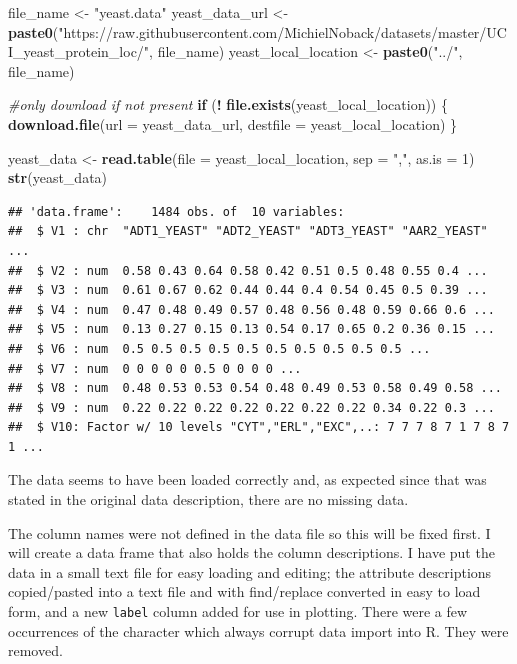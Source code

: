 \documentclass[]{book}
\newenvironment{Shaded}{\begin{snugshade}}{\end{snugshade}}
\newcommand{\CommentTok}[1]{\textcolor[rgb]{0.56,0.35,0.01}{\textit{#1}}}
\newcommand{\ControlFlowTok}[1]{\textcolor[rgb]{0.13,0.29,0.53}{\textbf{#1}}}
\newcommand{\DataTypeTok}[1]{\textcolor[rgb]{0.13,0.29,0.53}{#1}}
\newcommand{\DecValTok}[1]{\textcolor[rgb]{0.00,0.00,0.81}{#1}}
\newcommand{\KeywordTok}[1]{\textcolor[rgb]{0.13,0.29,0.53}{\textbf{#1}}}
\newcommand{\NormalTok}[1]{#1}
\newcommand{\OperatorTok}[1]{\textcolor[rgb]{0.81,0.36,0.00}{\textbf{#1}}}
\newcommand{\StringTok}[1]{\textcolor[rgb]{0.31,0.60,0.02}{#1}}
\begin{document}
\begin{Shaded}
\begin{Highlighting}[]
\NormalTok{file_name <-}\StringTok{ "yeast.data"}
\NormalTok{yeast_data_url <-}\StringTok{ }\KeywordTok{paste0}\NormalTok{(}\StringTok{"https://raw.githubusercontent.com/MichielNoback/datasets/master/UCI_yeast_protein_loc/"}\NormalTok{, file_name)}
\NormalTok{yeast_local_location <-}\StringTok{ }\KeywordTok{paste0}\NormalTok{(}\StringTok{"../"}\NormalTok{, file_name)}

\CommentTok{#only download if not present}
\ControlFlowTok{if}\NormalTok{ (}\OperatorTok{!}\StringTok{ }\KeywordTok{file.exists}\NormalTok{(yeast_local_location)) \{}
    \KeywordTok{download.file}\NormalTok{(}\DataTypeTok{url =}\NormalTok{ yeast_data_url, }
                  \DataTypeTok{destfile =}\NormalTok{ yeast_local_location)}
\NormalTok{\}}

\NormalTok{yeast_data <-}\StringTok{ }\KeywordTok{read.table}\NormalTok{(}\DataTypeTok{file =}\NormalTok{ yeast_local_location,}
                         \DataTypeTok{sep =} \StringTok{","}\NormalTok{,}
                         \DataTypeTok{as.is =} \DecValTok{1}\NormalTok{)}
\KeywordTok{str}\NormalTok{(yeast_data)}
\end{Highlighting}
\end{Shaded}

\begin{verbatim}
## 'data.frame':    1484 obs. of  10 variables:
##  $ V1 : chr  "ADT1_YEAST" "ADT2_YEAST" "ADT3_YEAST" "AAR2_YEAST" ...
##  $ V2 : num  0.58 0.43 0.64 0.58 0.42 0.51 0.5 0.48 0.55 0.4 ...
##  $ V3 : num  0.61 0.67 0.62 0.44 0.44 0.4 0.54 0.45 0.5 0.39 ...
##  $ V4 : num  0.47 0.48 0.49 0.57 0.48 0.56 0.48 0.59 0.66 0.6 ...
##  $ V5 : num  0.13 0.27 0.15 0.13 0.54 0.17 0.65 0.2 0.36 0.15 ...
##  $ V6 : num  0.5 0.5 0.5 0.5 0.5 0.5 0.5 0.5 0.5 0.5 ...
##  $ V7 : num  0 0 0 0 0 0.5 0 0 0 0 ...
##  $ V8 : num  0.48 0.53 0.53 0.54 0.48 0.49 0.53 0.58 0.49 0.58 ...
##  $ V9 : num  0.22 0.22 0.22 0.22 0.22 0.22 0.22 0.34 0.22 0.3 ...
##  $ V10: Factor w/ 10 levels "CYT","ERL","EXC",..: 7 7 7 8 7 1 7 8 7 1 ...
\end{verbatim}

The data seems to have been loaded correctly and, as expected since that was stated in the original data description, there are no missing data.

The column names were not defined in the data file so this will be fixed first. I will create a data frame that also holds the column descriptions. I have put the data in a small text file for easy loading and editing; the attribute descriptions copied/pasted into a text file and with find/replace converted in easy to load form, and a new \texttt{label} column added for use in plotting. There were a few occurrences of the \texttt{\textquotesingle{}} character which always corrupt data import into R. They were removed.
\end{document}
